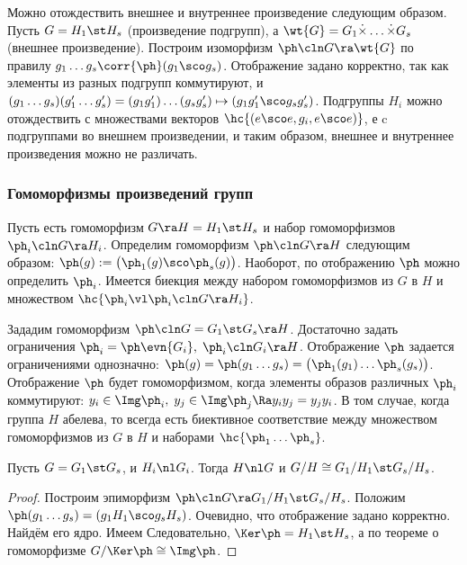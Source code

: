 \documentclass[a4paper]{article}
\begin{document}
Можно отождествить внешнее и внутреннее произведение следующим образом. Пусть $G = H_1 \st H_s$
(произведение подгрупп), а $\wt{G} = G_1 \dot{\times} \ldots \dot{\times} G_s$ (внешнее произведение). Построим
изоморфизм $\ph\cln G \ra \wt{G}$ по правилу $g_1 \ldots g_s \corr{\ph} (g_1 \sco g_s)$. Отображение задано
корректно, так как элементы из разных подгрупп коммутируют, и $(g_1 \ldots g_s)(g_1' \ldots g_s')=(g_1 g_1')
\ldots (g_s g_s') \mapsto (g_1g_1' \sco g_s g_s')$. Подгруппы $H_i$ можно отождествить с множествами векторов
$\hc{(e \sco e, g_i, e \sco e)}$, е c подгруппами во внешнем произведении, и таким образом, внешнее и
внутреннее произведения можно не различать.

\subsubsection{Гомоморфизмы произведений групп}

Пусть есть гомоморфизм $G \ra H= H_1 \st H_s$ и набор гомоморфизмов $\ph_i\cln G \ra H_i$. Определим  гомоморфизм
$\ph\cln G \ra H$ следующим образом: $\ph(g):=\bigl(\ph_1(g) \sco \ph_s(g)\bigr)$. Наоборот, по отображению
$\ph$ можно определить $\ph_i$. Имеется биекция между набором гомоморфизмов из $G$ в $H$ и множеством
$\hc{\ph_i \vl \ph_i\cln G\ra H_i}$.

Зададим гомоморфизм $\ph\cln G= G_1 \st G_s \ra H$. Достаточно задать ограничения
$\ph_i=\ph\evn{G_i}, \; \ph_i\cln G_i \ra H$. Отображение $\ph$ задается ограничениями  однозначно: $\ph(g) = \ph(g_1 \ldots
g_s) = \bigl(\ph_1(g_1) \ldots \ph_s(g_s)\bigr)$. Отображение $\ph$ будет гомоморфизмом, когда элементы
образов различных $\ph_i$ коммутируют: $y_i \in \Img \ph_i, \; y_j \in \Img \ph_j \Ra y_i y_j = y_j y_i$. В
том случае, когда группа $H$ абелева, то всегда есть биективное соответствие между множеством
гомоморфизмов из $G$ в $H$ и наборами $\hc{\ph_1 \ldots \ph_s}$.

\begin{theorem}
Пусть $G = G_1 \st G_s$, и $H_i \nl G_i$. Тогда $H \nl G$ и $G/H \cong G_1/H_1 \st G_s/H_s$.
\end{theorem}
\begin{proof}
Построим эпиморфизм $\ph\cln G \ra G_1/H_1 \st G_s/H_s$. Положим $\ph(g_1 \ldots g_s) = (g_1H_1 \sco g_s H_s)$.
Очевидно, что отображение задано корректно. Найдём его ядро. Имеем
Следовательно, $\Ker \ph = H_1 \st H_s$, а по теореме о гомоморфизме $G/\Ker \ph
\cong \Img \ph$.
\end{proof}
\end{document}
